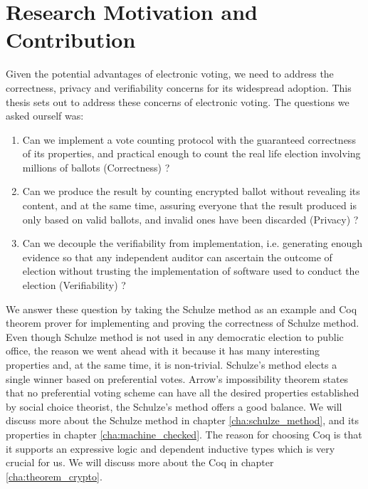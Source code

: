 \section{Research Motivation and Contribution}
Given the potential advantages of electronic voting,  we need to address
the correctness, privacy and verifiability concerns for its widespread adoption. 
This thesis sets out to address these concerns of electronic voting. 
The questions we asked ourself was:
 \begin{enumerate} 
  \item Can we implement a vote counting protocol with the  
    guaranteed correctness of its properties, and practical enough
    to count the real life election involving millions of ballots (Correctness) ?
  \item Can we produce the result by counting encrypted ballot without revealing 
  its content, and at the same time, 
  assuring everyone that the result produced is only based on valid ballots, 
  and invalid ones have been discarded  (Privacy) ?
 \item Can we decouple the verifiability from implementation, i.e. 
    generating enough evidence so that any independent auditor can 
    ascertain the outcome of election without trusting the implementation 
    of software used to conduct the election (Verifiability) ?
  \end{enumerate}

\noindent
We answer these question by taking the Schulze method \citep{Schulze:2011:NMC} 
as an example and Coq \citep{Bertot:2004:ITP}
theorem prover  for implementing and proving the correctness of  Schulze method.
Even though Schulze method is not used in any democratic election to public office, the reason 
 we went ahead with it because it has many interesting properties and, 
 at the same time, it is non-trivial.   Schulze's method elects  a single winner based on 
preferential votes.  Arrow's impossibility theorem \citep{Arrow:1950:DCS} states
 that no preferential voting 
scheme can have all the desired properties established by  social choice theorist,
the Schulze's method offers a good balance. We will discuss more about the Schulze method in 
chapter \ref{cha:schulze_method}, and its properties in chapter \ref{cha:machine_checked}. 
The reason for choosing Coq is that it supports an expressive logic and dependent 
inductive types which is very crucial for us. We will discuss more about the Coq in 
chapter \ref{cha:theorem_crypto}.

